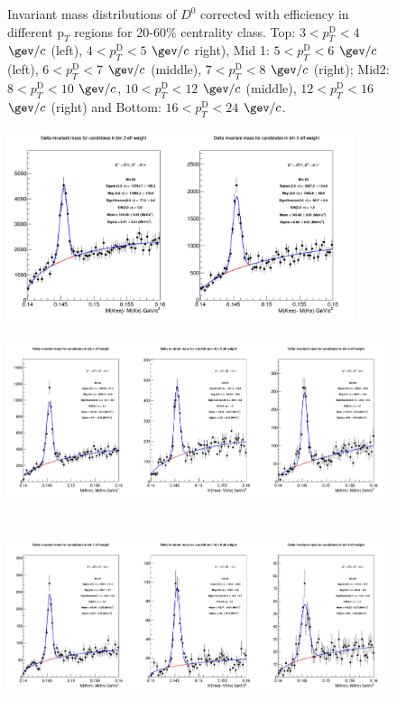 \begin{figure}[!htp]
\caption{Invariant mass distributions of $D^0$ corrected with efficiency in different $\text{p}_T$ regions for 20-60$\%$ centrality class. Top: $3< p_{T}^{\text{D}}< 4$ $\gev/c$ (left), $4< p_{T}^{\text{D}}< 5$ $\gev/c$ right), Mid 1: $5< p_{T}^{\text{D}}< 6$ $\gev/c$ (left), $6 < p_{T}^{\text{D}} < 7$ $\gev/c$ (middle), $7< p_{T}^{\text{D}}< 8$ $\gev/c$ (right); Mid2: $8< p_{T}^{\text{D}}< 10$ $\gev/c$, $10< p_{T}^{\text{D}}< 12$ $\gev/c$  (middle), $12 < p_{T}^{\text{D}}< 16$ $\gev/c$  (right) and Bottom: $16<p_{T}^{\text{D}}< 24$ $\gev/c$.}
\label{fig:InvMassD02060}
\end{figure}


\begin{figure}[!htp]
\centering
{\includegraphics[width=1\linewidth, height=5.6cm]{figuresVsCent/Dstar/MassPlots/2060/InvMassDistributions_Dstar_Bins2to3.png}}
{\includegraphics[width=1\linewidth, height=5.6cm]{figuresVsCent/Dstar/MassPlots/2060/InvMassDistributions_Dstar_Bins4to6.png}}
{\includegraphics[width=1\linewidth, height=5.6cm]{figuresVsCent/Dstar/MassPlots/2060/InvMassDistributions_Dstar_Bins7to9.png}}

\end{figure}
